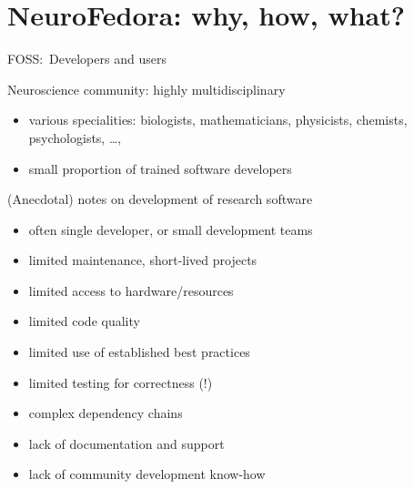 \section{NeuroFedora: why, how, what?}
\begin{frame}[c]{FOSS:\ Developers and users}
  \begin{figure}[h]
  \begin{center}
  \end{center}
  \end{figure}
\end{frame}
\begin{frame}[c]{Neuroscience community: highly multidisciplinary}
  \begin{itemize}
    \item \alert{various specialities:} biologists, mathematicians, physicists, chemists, psychologists, \ldots, 
      \pause{}
    \item \alert{small proportion of trained software developers}
  \end{itemize}
\end{frame}
\begin{frame}[c]{(Anecdotal) notes on development of research software}
  \begin{itemize}
    \item often \alert{single developer}, or small development teams
    \item limited \alert{maintenance, short-lived projects}
    \item limited \alert{access to hardware/resources}
    \item limited \alert{code quality}
    \item limited \alert{use of established best practices}
    \item limited \alert{testing for correctness (!)}
    \item \alert{complex dependency chains}
    \item lack of \alert{documentation and support}
    \item lack of \alert{community development know-how}
  \end{itemize}
\end{frame}

